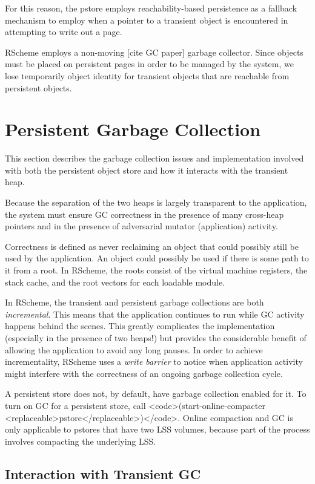 \documentclass[10pt,letterpaper]{article}
\begin{document}
For this reason, the pstore employs reachability-based persistence as
a fallback mechanism to employ when a pointer to a transient object is
encountered in attempting to write out a page.

RScheme employs a non-moving [cite GC paper] garbage collector.  Since
objects must be placed on persistent pages in order to be managed by
the system, we lose temporarily object identity for transient objects
that are reachable from persistent objects.

\section{Persistent Garbage Collection}

This section describes the garbage collection issues and implementation
involved with both the persistent object store and how it interacts
with the transient heap.  

Because the separation of the two heaps
is largely transparent to the application, the system must ensure
GC correctness in the presence of many cross-heap pointers and in
the presence of adversarial mutator (application) activity.

Correctness is defined as never reclaiming an object that could
possibly still be used by the application.  An object could possibly
be used if there is some path to it from a root.  In RScheme, the
roots consist of the virtual machine registers, the stack cache,
and the root vectors for each loadable module.

In RScheme, the transient and persistent garbage collections are both
\emph{incremental}.  This means that the application
continues to run while GC activity happens behind the scenes.  This
greatly complicates the implementation (especially in the presence of
two heaps!)  but provides the considerable benefit of allowing the
application to avoid any long pauses.  In order to achieve
incrementality, RScheme uses a \emph{write barrier} to
notice when application activity might interfere with the correctness
of an ongoing garbage collection cycle.

A persistent store does not, by default, have garbage collection
enabled for it.  To turn on GC for a persistent store, call
<code>(start-online-compacter <replaceable>pstore</replaceable>)</code>.
Online compaction and GC is only applicable to pstores that have two
LSS volumes, because part of the process involves compacting the
underlying LSS.

\subsection{Interaction with Transient GC}
\end{document}
